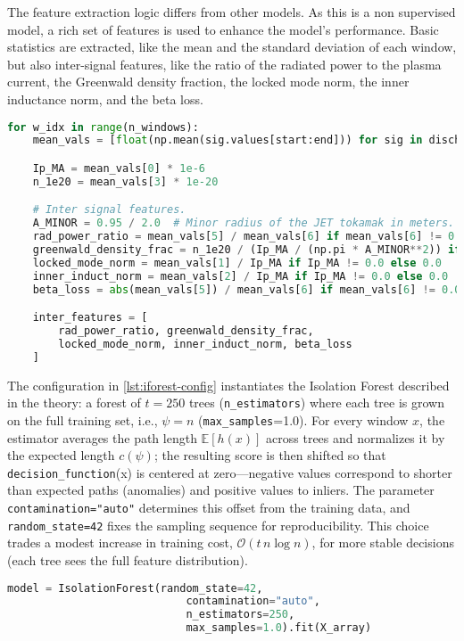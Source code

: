 The feature extraction logic differs from other models. As this is a non supervised model, a rich set of features is used to enhance the model's performance. Basic statistics are extracted, like the mean and the standard deviation of each window, but also inter-signal features, like the ratio of the radiated power to the plasma current, the Greenwald density fraction, the locked mode norm, the inner inductance norm, and the beta loss.

\begin{lstlisting}[language=Python, caption={Inter-signal features extraction}, label={lst:inter-signal-features}]
for w_idx in range(n_windows):
    mean_vals = [float(np.mean(sig.values[start:end])) for sig in discharge.signals]

    Ip_MA = mean_vals[0] * 1e-6
    n_1e20 = mean_vals[3] * 1e-20

    # Inter signal features.
    A_MINOR = 0.95 / 2.0  # Minor radius of the JET tokamak in meters. Used in the Greenwald limit.
    rad_power_ratio = mean_vals[5] / mean_vals[6] if mean_vals[6] != 0.0 else 0.0
    greenwald_density_frac = n_1e20 / (Ip_MA / (np.pi * A_MINOR**2)) if Ip_MA != 0.0 else 0.0
    locked_mode_norm = mean_vals[1] / Ip_MA if Ip_MA != 0.0 else 0.0
    inner_induct_norm = mean_vals[2] / Ip_MA if Ip_MA != 0.0 else 0.0
    beta_loss = abs(mean_vals[5]) / mean_vals[6] if mean_vals[6] != 0.0 else 0.0

    inter_features = [
        rad_power_ratio, greenwald_density_frac,
        locked_mode_norm, inner_induct_norm, beta_loss
    ]
\end{lstlisting}

The configuration in \autoref{lst:iforest-config} instantiates the Isolation Forest described in the theory: a forest of $t=250$ trees (\texttt{n\_estimators}) where each tree is grown on the full training set, i.e., $\psi=n$ (\texttt{max\_samples}=1.0). For every window $x$, the estimator averages the path length $\mathbb{E}[h(x)]$ across trees and normalizes it by the expected length $c(\psi)$; the resulting score is then shifted so that \texttt{decision\_function}(x) is centered at zero—negative values correspond to shorter than expected paths (anomalies) and positive values to inliers. The parameter \texttt{contamination="auto"} determines this offset from the training data, and \texttt{random\_state=42} fixes the sampling sequence for reproducibility. This choice trades a modest increase in training cost, $\mathcal{O}(t\,n\log n)$, for more stable decisions (each tree sees the full feature distribution).

\begin{lstlisting}[language=Python, caption={Isolation Forest model configuration}, label={lst:iforest-config}]
    model = IsolationForest(random_state=42, 
                            contamination="auto",
                            n_estimators=250,
                            max_samples=1.0).fit(X_array)
\end{lstlisting}




